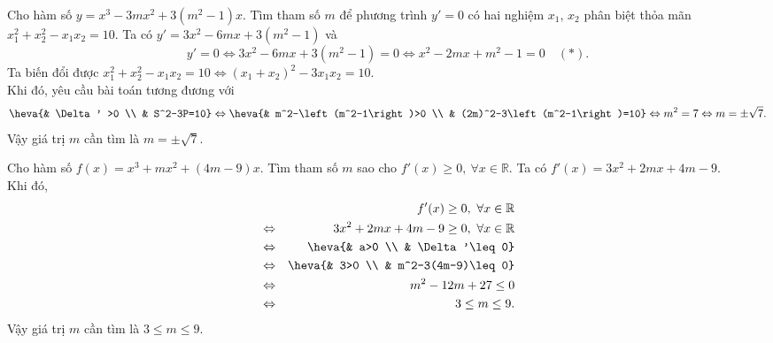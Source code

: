\begin{bt}%
	Cho hàm số $y=x^3-3mx^2+3\left(m^2-1\right)x$. Tìm tham số $m$ để phương trình $y'=0$ có hai nghiệm $x_1$, $x_2$ phân biệt thỏa mãn $x_1^2+x_2^2-x_1x_2=10$.
	\loigiai
	{Ta có $y'=3x^2-6mx+3\left(m^2-1\right)$ và $$y'=0\Leftrightarrow 3x^2-6mx+3\left(m^2-1\right)=0\Leftrightarrow x^2-2mx+m^2-1=0\quad (*).$$
		Ta biến đổi được $x_1^2+x_2^2-x_1x_2=10\Leftrightarrow \left(x_1+x_2\right)^2-3x_1x_2=10$.\\
		Khi đó, yêu cầu bài toán tương đương với
		\begin{eqnarray*}
			\heva{& \Delta' >0 \\ & S^2-3P=10}\Leftrightarrow\heva{& m^2-\left(m^2-1\right)>0 \\ & (2m)^2-3\left(m^2-1\right)=10}\Leftrightarrow m^2=7\Leftrightarrow m=\pm\sqrt{7}.
		\end{eqnarray*}
		Vậy giá trị $m$ cần tìm là $m=\pm\sqrt{7}$.
	}
\end{bt}

\begin{bt}%
	Cho hàm số $f(x)=x^3+mx^2+(4m-9)x$. Tìm tham số $m$ sao cho $f'(x)\geq 0,\ \forall x\in\mathbb{R}$.
	\loigiai
	{Ta có $f'(x)=3x^2+2mx+4m-9$.\\
		Khi đó,
		\begin{eqnarray*}
			&& f'(x)\geq 0,\ \forall x\in\mathbb{R}\\
			&\Leftrightarrow & 3x^2+2mx+4m-9\geq 0,\ \forall x\in\mathbb{R}\\
			&\Leftrightarrow &\heva{& a>0 \\ & \Delta'\leq 0}\\
			&\Leftrightarrow & \heva{& 3>0 \\ & m^2-3(4m-9)\leq0}\\
			&\Leftrightarrow & m^2-12m+27\leq 0\\
			&\Leftrightarrow & 3\leq m\leq 9.
		\end{eqnarray*}
		Vậy giá trị $m$ cần tìm là $3\leq m\leq 9$.
	}
\end{bt}

